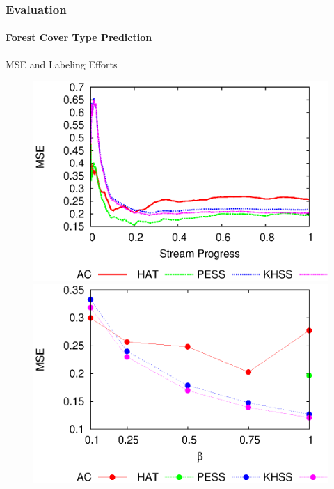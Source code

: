 \documentclass[14pt]{beamer}
\begin{document}
\begin{frame}
\frametitle{Evaluation}
\framesubtitle{Forest Cover Type Prediction}
MSE and Labeling Efforts
\begin{figure}[htp!]
\centering
\includegraphics[scale=0.41]{covtype_mse.eps}
\includegraphics[scale=0.41]{covtype_le_mse.eps}
\end{figure}
\end{frame}
\end{document}

